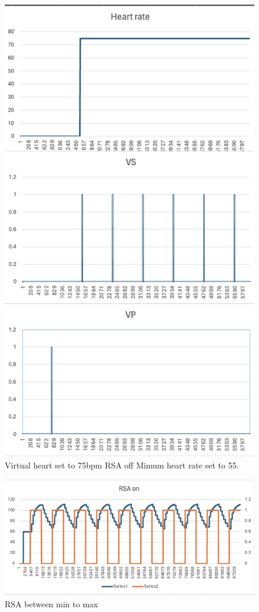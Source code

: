 \documentclass[conference]{IEEEtran}
\begin{document}
\begin{figure}[htbp]
	\centerline{\includegraphics[scale=0.5]{./fig/result_75.png}}
	\caption{Virtual heart set to 75bpm RSA off Mimum heart rate set to 55.}
	\label{lif}
\end{figure}

\begin{figure}[htbp]
	\centerline{\includegraphics[scale=0.5]{./fig/result_rsa.png}}
	\caption{RSA between min to max}
	\label{lif}
\end{figure}
\end{document}
